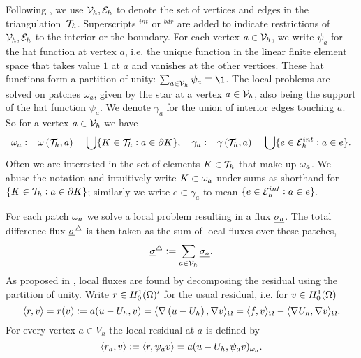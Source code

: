 \documentclass[thesis.tex]{subfiles}
\begin{document}
Following \cite{ernequil}, we use $\mathcal{V}_h, \mathcal{E}_h$ to denote  the set of vertices and edges in the triangulation~$\mathcal{T}_h$. 
Superscripts  $^{int}$ or $^{bdr}$ are added to indicate restrictions of $\mathcal{V}_h, \mathcal{E}_h$ to the interior or the boundary.
For each vertex $a \in \mathcal{V}_h$, we write $\psi_a$ for the hat function at vertex $a$, 
i.e. the unique function in the linear finite element space
that takes value $1$ at $a$ and vanishes at the other vertices.
These hat functions form a partition of unity: $\sum_{a \in \V_h} \psi_a \equiv \1$.
The local problems are solved on patches $\omega_a$, given by the star at a vertex $a \in \mathcal{V}_h$, also being the support of
the hat function $\psi_a$. We denote $\gamma_a$ for the union of interior edges touching $a$. 
So for a vertex $a \in \mathcal{V}_h$ we have
\[
  \omega_a       := \omega\left(\mathcal{T}_h, a\right) = \bigcup \{ K \in \mathcal{T}_h : a \in \partial K\},
  \quad \gamma_a := \gamma\left(\mathcal{T}_h, a\right) = \bigcup \{ e \in \mathcal{E}_h^{int} : a \in e\}.
\]
Often we are interested in the set of elements $K \in \mathcal{T}_h$ that make up $\omega_a$. We abuse the notation and intuitively write $K \subset \omega_a$
under sums as shorthand for $\set{K \in \mathcal{T}_h : a \in \partial K}$; similarly we write $e \subset \gamma_a$ to mean $\{e \in \mathcal{E}_h^{int} : a\in e\}$.
  
For each patch $\omega_a$ we solve a local problem resulting in a  flux $\underline{\sigma_a}$. 
The total difference flux $\underline{\sigma}^\triangle$ is then taken as the sum of local fluxes over these patches, 
\[
  \underline{\sigma}^\triangle := \sum_{a \in \mathcal{V}_h} \underline{\sigma_a}.
\] 
As proposed  in \cite{braessequilrobust}, local fluxes are found by decomposing the residual using the partition of unity. 
Write $r \in H_0^1(\Omega)'$ for the usual residual, i.e. for $v\in H_0^1(\Omega)$ 
\[
  \langle r,v \rangle = r(v) := a(u - U_h, v) = \langle \nabla \left(u - U_h\right), \nabla v \rangle_\Omega = \langle f,v \rangle_\Omega - \langle \nabla U_h,\nabla v \rangle_\Omega.
\]
For every vertex $a \in V_h$ the local residual at $a$ is defined by
\[
  \langle r_a,v \rangle := \langle r,\psi_a v \rangle = a(u - U_h, \psi_a v)_{\omega_a}.
\]
\end{document}
